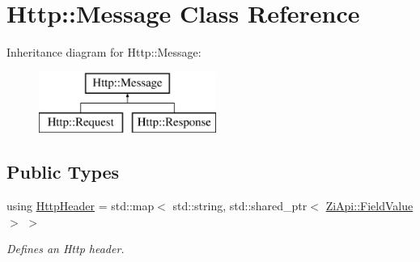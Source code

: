 \hypertarget{classHttp_1_1Message}{}\section{Http\+::Message Class Reference}
\label{classHttp_1_1Message}
Inheritance diagram for Http\+::Message\+:\begin{figure}[H]
\begin{center}
\leavevmode
\includegraphics[height=2.000000cm]{classHttp_1_1Message}
\end{center}
\end{figure}
\subsection*{Public Types}
\begin{DoxyCompactItemize}
\item 
using \mbox{\hyperlink{classHttp_1_1Message_ae02720de7f072d0607fd217af6250989}{Http\+Header}} = std\+::map$<$ std\+::string, std\+::shared\+\_\+ptr$<$ \mbox{\hyperlink{classZiApi_1_1FieldValue}{Zi\+Api\+::\+Field\+Value}} $>$ $>$
\begin{DoxyCompactList}\small\item\em Defines an Http header. \end{DoxyCompactList}\end{DoxyCompactItemize}
